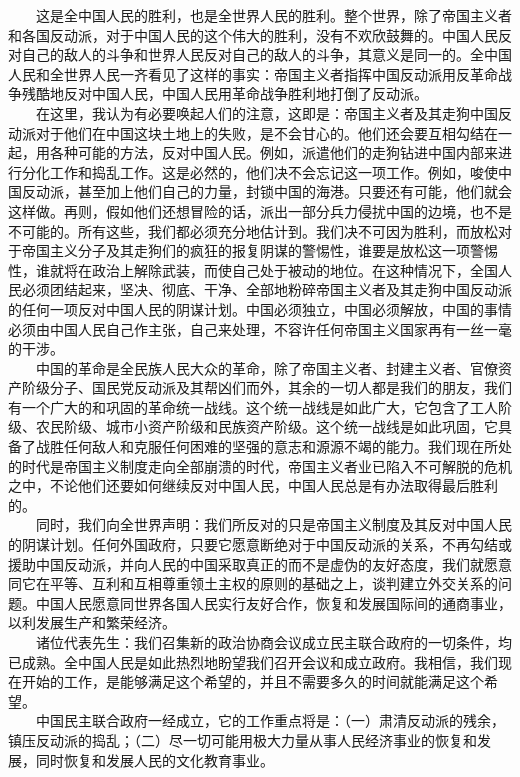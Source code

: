 \documentclass[cn,11pt,chinese]{elegantbook}
\begin{document}
　　这是全中国人民的胜利，也是全世界人民的胜利。整个世界，除了帝国主义者和各国反动派，对于中国人民的这个伟大的胜利，没有不欢欣鼓舞的。中国人民反对自己的敌人的斗争和世界人民反对自己的敌人的斗争，其意义是同一的。全中国人民和全世界人民一齐看见了这样的事实：帝国主义者指挥中国反动派用反革命战争残酷地反对中国人民，中国人民用革命战争胜利地打倒了反动派。\\
　　在这里，我认为有必要唤起人们的注意，这即是：帝国主义者及其走狗中国反动派对于他们在中国这块土地上的失败，是不会甘心的。他们还会要互相勾结在一起，用各种可能的方法，反对中国人民。例如，派遣他们的走狗钻进中国内部来进行分化工作和捣乱工作。这是必然的，他们决不会忘记这一项工作。例如，唆使中国反动派，甚至加上他们自己的力量，封锁中国的海港。只要还有可能，他们就会这样做。再则，假如他们还想冒险的话，派出一部分兵力侵扰中国的边境，也不是不可能的。所有这些，我们都必须充分地估计到。我们决不可因为胜利，而放松对于帝国主义分子及其走狗们的疯狂的报复阴谋的警惕性，谁要是放松这一项警惕性，谁就将在政治上解除武装，而使自己处于被动的地位。在这种情况下，全国人民必须团结起来，坚决、彻底、干净、全部地粉碎帝国主义者及其走狗中国反动派的任何一项反对中国人民的阴谋计划。中国必须独立，中国必须解放，中国的事情必须由中国人民自己作主张，自己来处理，不容许任何帝国主义国家再有一丝一毫的干涉。\\
　　中国的革命是全民族人民大众的革命，除了帝国主义者、封建主义者、官僚资产阶级分子、国民党反动派及其帮凶们而外，其余的一切人都是我们的朋友，我们有一个广大的和巩固的革命统一战线。这个统一战线是如此广大，它包含了工人阶级、农民阶级、城市小资产阶级和民族资产阶级。这个统一战线是如此巩固，它具备了战胜任何敌人和克服任何困难的坚强的意志和源源不竭的能力。我们现在所处的时代是帝国主义制度走向全部崩溃的时代，帝国主义者业已陷入不可解脱的危机之中，不论他们还要如何继续反对中国人民，中国人民总是有办法取得最后胜利的。\\
　　同时，我们向全世界声明：我们所反对的只是帝国主义制度及其反对中国人民的阴谋计划。任何外国政府，只要它愿意断绝对于中国反动派的关系，不再勾结或援助中国反动派，并向人民的中国采取真正的而不是虚伪的友好态度，我们就愿意同它在平等、互利和互相尊重领土主权的原则的基础之上，谈判建立外交关系的问题。中国人民愿意同世界各国人民实行友好合作，恢复和发展国际间的通商事业，以利发展生产和繁荣经济。\\
　　诸位代表先生：我们召集新的政治协商会议成立民主联合政府的一切条件，均已成熟。全中国人民是如此热烈地盼望我们召开会议和成立政府。我相信，我们现在开始的工作，是能够满足这个希望的，并且不需要多久的时间就能满足这个希望。\\
　　中国民主联合政府一经成立，它的工作重点将是：（一）肃清反动派的残余，镇压反动派的捣乱；（二）尽一切可能用极大力量从事人民经济事业的恢复和发展，同时恢复和发展人民的文化教育事业。\\
\end{document}

